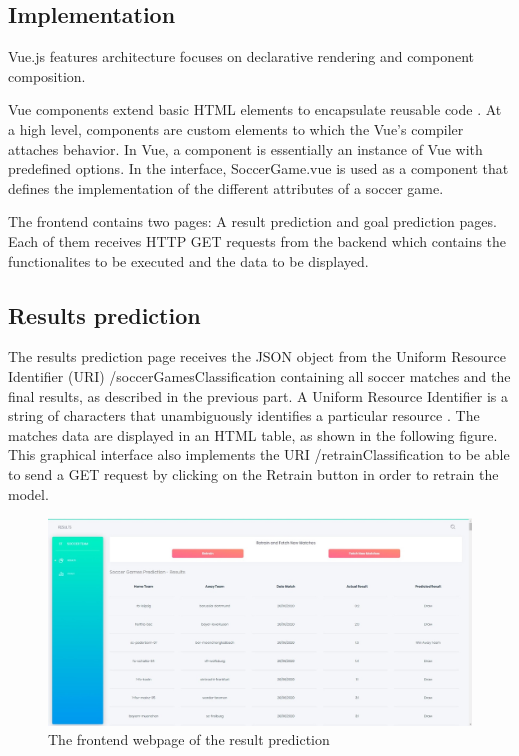 \subsection{Implementation}
Vue.js features architecture focuses on declarative rendering and component composition.

Vue components extend basic HTML elements to encapsulate reusable code \cite{vue:2020}.
At a high level, components are custom elements to which the Vue's compiler attaches behavior. 
In Vue, a component is essentially an instance of Vue with predefined options.
In the interface, SoccerGame.vue is used as a component that defines the implementation of the different attributes of a soccer game.

The frontend contains two pages: A result prediction and goal prediction pages. Each of them 
receives HTTP GET requests from the backend which contains the functionalites to be executed and the data to be displayed.

\subsection{Results prediction}

The results prediction page receives the JSON object from the Uniform Resource Identifier (URI) /soccerGamesClassification containing all soccer matches and the final results, as described in the previous part.
A Uniform Resource Identifier is a string of characters that unambiguously identifies a particular resource \cite{uri:2005}.
The matches data are displayed in an HTML table, as shown in the following figure.
This graphical interface also implements the URI /retrainClassification to be able to send a GET request by clicking on the Retrain button in order to retrain the model.

\begin{figure}[H]
    \centering
    \includegraphics[width=1\textwidth]{images/frontend_results_prediction.jpg}
    \caption{The frontend webpage of the result prediction}
    \label{fig:result_frontend}
    \end{figure}

